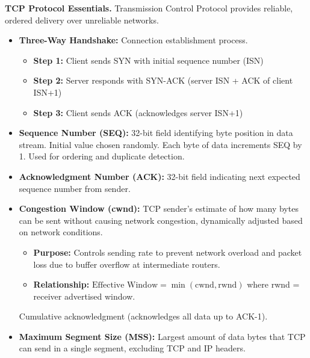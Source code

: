 \begin{minipage}[htp]{0.5\textwidth}
    \noindent\textbf{TCP Protocol Essentials.} Transmission Control Protocol provides reliable, ordered delivery over unreliable networks.
    \begin{itemize}[noitemsep,nolistsep,topsep=0px,partopsep=0pt,parsep=0pt]
        \item[-] \textbf{Three-Way Handshake:} Connection establishment process.
        \begin{itemize}[noitemsep,nolistsep,topsep=-5px,partopsep=0pt,parsep=0pt]
            \item \textbf{Step 1:} Client sends SYN with initial sequence number (ISN)
            \item \textbf{Step 2:} Server responds with SYN-ACK (server ISN + ACK of client ISN+1)
            \item \textbf{Step 3:} Client sends ACK (acknowledges server ISN+1)
        \end{itemize}
        \item[-] \textbf{Sequence Number (SEQ):} 32-bit field identifying byte position in data stream. Initial value chosen randomly. Each byte of data increments SEQ by 1. Used for ordering and duplicate detection.
        \item[-] \textbf{Acknowledgment Number (ACK):} 32-bit field indicating next expected sequence number from sender.
   \item[-] \textbf{Congestion Window (cwnd):} TCP sender's estimate of how many bytes can be sent without causing network congestion, dynamically adjusted based on network conditions.
        \begin{itemize}[noitemsep,nolistsep,topsep=-5px,partopsep=0pt,parsep=0pt]
            \item \textbf{Purpose:} Controls sending rate to prevent network overload and packet loss due to buffer overflow at intermediate routers.
            \item \textbf{Relationship:} $\boxed{\text{Effective Window} = \min(\text{cwnd}, \text{rwnd})}$ where rwnd = receiver advertised window.
        \end{itemize}
        \begin{center}
        \end{center}
        Cumulative acknowledgment (acknowledges all data up to ACK-1).
        \item[-] \textbf{Maximum Segment Size (MSS):} Largest amount of data bytes that TCP can send in a single segment, excluding TCP and IP headers.

\end{itemize}
\end{minipage}
